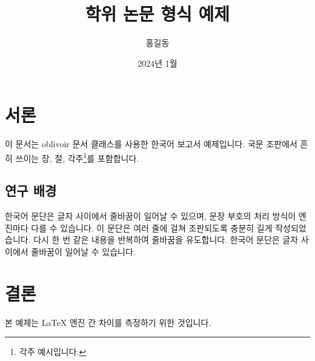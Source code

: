 \documentclass[a4paper,10pt]{oblivoir}
\begin{document}
\title{학위 논문 형식 예제}\author{홍길동}\date{2024년 1월}
\maketitle
\tableofcontents
\chapter{서론}
이 문서는 oblivoir 문서 클래스를 사용한 한국어 보고서 예제입니다. 국문 조판에서 흔히 쓰이는 장, 절, 각주\footnote{각주 예시입니다.}를 포함합니다.
\section{연구 배경}
한국어 문단은 글자 사이에서 줄바꿈이 일어날 수 있으며, 문장 부호의 처리 방식이 엔진마다 다를 수 있습니다. 이 문단은 여러 줄에 걸쳐 조판되도록 충분히 길게 작성되었습니다. 다시 한 번 같은 내용을 반복하여 줄바꿈을 유도합니다. 한국어 문단은 글자 사이에서 줄바꿈이 일어날 수 있습니다.
\chapter{결론}
본 예제는 \LaTeX{} 엔진 간 차이를 측정하기 위한 것입니다.
\end{document}
